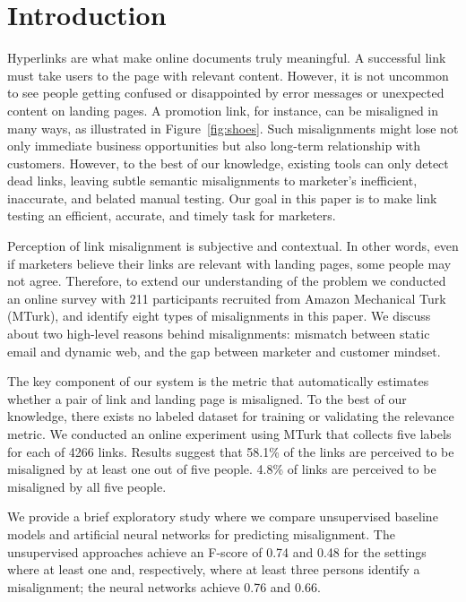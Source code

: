 \documentclass{sigchi}
\def\plainkeywords{Authors' choice; of terms; separated; by
  semicolons; include commas, within terms only; required.}
\begin{document}

\section{Introduction}
Hyperlinks are what make online documents truly meaningful. A successful link must take users to the page with relevant content. However, it is not uncommon to see people getting confused or disappointed by error messages or unexpected content on landing pages. A promotion link, for instance, can be misaligned in many ways, as illustrated in Figure~\ref{fig:shoes}. Such misalignments might lose not only immediate business opportunities but also long-term relationship with customers. However, to the best of our knowledge, existing tools can only detect dead links, leaving subtle semantic misalignments to marketer's inefficient, inaccurate, and belated manual testing. Our goal in this paper is to make link testing an efficient, accurate, and timely task for marketers. 

Perception of link misalignment is subjective and contextual. In other words, even if marketers believe their links are relevant with landing pages, some people may not agree. Therefore, to extend our understanding of the problem we conducted an online survey with 211 participants recruited from Amazon Mechanical Turk (MTurk), and identify eight types of misalignments in this paper. We discuss about two high-level reasons behind misalignments: mismatch between static email and dynamic web, and the gap between marketer and customer mindset. 

The key component of our system is the metric that automatically estimates whether a pair of link and landing page is misaligned. To the best of our knowledge, there exists no labeled dataset for training or validating the relevance metric. We conducted an online experiment using MTurk that collects five labels for each of 4266 links. Results suggest that 58.1\% of the links are perceived to be misaligned by at least one out of five people. 4.8\% of links are perceived to be misaligned by all five people.          

We provide a brief exploratory study where we compare unsupervised baseline models and artificial neural networks for predicting misalignment. The unsupervised approaches achieve an F-score of 0.74 and 0.48 for the settings where at least one and, respectively, where at least three persons identify a misalignment; the neural networks achieve 0.76 and 0.66.
\end{document}
